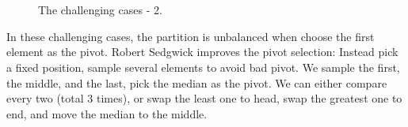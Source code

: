 \documentclass[b5paper]{article}
\begin{document}
\begin{figure}[htbp]
   \centering
    \\
    \\
   \caption{The challenging cases - 2.}
   \label{fig:worst-cases-2}
\end{figure}

In these challenging cases, the partition is unbalanced when choose the first element as the pivot. Robert Sedgwick improves the pivot selection\cite{qsort-impl}: Instead pick a fixed position, sample several elements to avoid bad pivot. We sample the first, the middle, and the last, pick the median as the pivot. We can either compare every two (total 3 times)\cite{3-way-part}, or swap the least one to head, swap the greatest one to end, and move the median to the middle.
\end{document}
